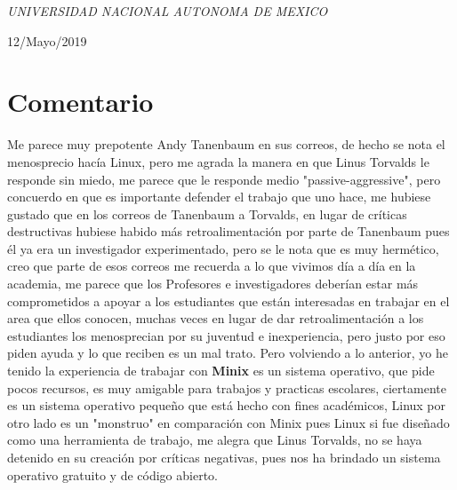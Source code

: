 \documentclass[a4paper, 11pt, oneside]{article}
\begin{document}
\begin{titlepage}
	\textit{UNIVERSIDAD NACIONAL AUTONOMA DE MEXICO} 
	
	\vfill
	
	
	
	
	\vspace{0.3\baselineskip} 
	
    12/Mayo/2019 
	
	 

\end{titlepage}

\section*{Comentario}

Me parece muy prepotente Andy Tanenbaum en sus correos, de hecho se nota el menosprecio hacía Linux, pero me agrada la manera en que Linus Torvalds le responde sin miedo, me parece que le responde medio "passive-aggressive", pero concuerdo en que es importante defender el trabajo que uno hace, me hubiese gustado que en los correos de Tanenbaum a Torvalds, en lugar de críticas destructivas hubiese habido más retroalimentación por parte de Tanenbaum pues él ya era un investigador experimentado, pero se le nota que es muy hermético, creo que parte de esos correos me recuerda a lo que vivimos día a día en la academia, me parece que los Profesores e investigadores deberían estar más comprometidos a apoyar a los estudiantes que están interesadas en trabajar en el area que ellos conocen, muchas veces en lugar de dar retroalimentación a los estudiantes los menosprecian por su juventud e inexperiencia, pero justo por eso piden ayuda y lo que reciben es un mal trato. Pero volviendo a lo anterior, yo he tenido la experiencia de trabajar con \textbf{Minix} es un sistema operativo, que pide pocos recursos, es muy amigable para trabajos y practicas escolares, ciertamente es un sistema operativo pequeño que está hecho con fines académicos, Linux por otro lado es un "monstruo" en comparación con Minix pues Linux si fue diseñado como una herramienta de trabajo, me alegra que Linus Torvalds, no se haya detenido en su creación por críticas negativas, pues nos ha brindado un sistema operativo gratuito y de código abierto.
\end{document}
